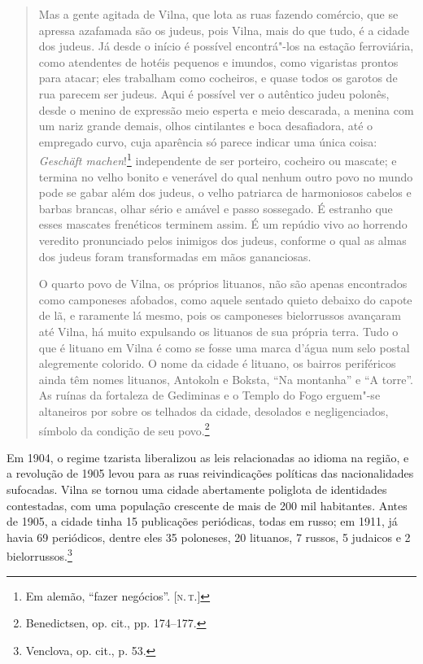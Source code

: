 \begin{quote}
Mas a gente agitada de Vilna, que lota as ruas fazendo comércio, que se
apressa azafamada são os judeus, pois Vilna, mais do que tudo, é a
cidade dos judeus. Já desde o início é possível encontrá"-los na estação
ferroviária, como atendentes de hotéis pequenos e imundos, como
vigaristas prontos para atacar; eles trabalham como cocheiros, e quase
todos os garotos de rua parecem ser judeus. Aqui é possível ver o
autêntico judeu polonês, desde o menino de expressão meio esperta e meio
descarada, a menina com um nariz grande demais, olhos cintilantes e boca
desafiadora, até o empregado curvo, cuja aparência só parece indicar uma
única coisa: \textit{Geschäft machen}!\footnote{Em alemão, ``fazer negócios''. [\textsc{n.\,t.}]}
independente de ser porteiro, cocheiro ou mascate; e termina no velho
bonito e venerável do qual nenhum outro povo no mundo pode se gabar além
dos judeus, o velho patriarca de harmoniosos cabelos e barbas brancas,
olhar sério e amável e passo sossegado. É estranho que esses mascates
frenéticos terminem assim. É um repúdio vivo ao horrendo veredito
pronunciado pelos inimigos dos judeus, conforme o qual as almas dos
judeus foram transformadas em mãos gananciosas.

O quarto povo de Vilna, os próprios lituanos, não são apenas encontrados
como camponeses afobados, como aquele sentado quieto debaixo do capote
de lã, e raramente lá mesmo, pois os camponeses bielorrussos avançaram até
Vilna, há muito expulsando os lituanos de sua própria terra. Tudo o que
é lituano em Vilna é como se fosse uma marca d'água num selo postal
alegremente colorido. O nome da cidade é lituano, os bairros periféricos
ainda têm nomes lituanos, Antokoln e Boksta, ``Na montanha'' e ``A
torre''. As ruínas da fortaleza de Gediminas e o Templo do Fogo
erguem"-se altaneiros por sobre os telhados da cidade, desolados e
negligenciados, símbolo da condição de seu povo.\footnote{Benedictsen, op. cit., pp. 174--177.} 
\end{quote}

Em 1904, o regime tzarista liberalizou as leis relacionadas ao idioma na
região, e a revolução de 1905 levou para as ruas reivindicações
políticas das nacionalidades sufocadas. Vilna se tornou uma cidade
abertamente poliglota de identidades contestadas, com uma população
crescente de mais de 200 mil habitantes. Antes de 1905, a cidade tinha
15 publicações periódicas, todas em russo; em 1911, já havia 69
periódicos, dentre eles 35 poloneses, 20 lituanos, 7 russos, 5 judaicos
e 2 bielorrussos.\footnote{Venclova, op. cit., p. 53.}

